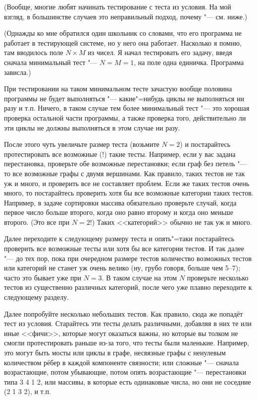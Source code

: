 (Вообще, многие любят начинать тестирование с теста из условия. На мой взгляд, в большинстве случаев это неправильный подход, почему "--- см. ниже.)

(Однажды ко мне обратился один школьник со словами, что его программа не работает в тестирующей системе, но у него она работает.
Насколько я помню, там вводилось поле $N\times M$ из чисел. 
Я начал тестировать его задачу, введя сначала минимальный тест "--- $N=M=1$, на поле одна единичка. 
Программа зависла.)

При тестировании на таком минимальном тесте зачастую вообще половина программы не будет выполняться "--- какие"=нибудь циклы не выполняться ни разу и т.п.
Ничего, в таком случае тем более минимальный тест "--- это хорошая проверка остальной части программы,
а также проверка того, действительно ли эти циклы не должны выполняться в этом случае ни разу.

После этого чуть увеличьте размер теста (возьмите $N=2$) и постарайтесь протестировать все возможные (!) такие тесты. 
Например, если у вас задана перестановка, проверьте обе возможные перестановки; если граф без петель "--- то все возможные графы с двумя вершинами. 
Как правило, таких тестов не так уж и много, и проверить все не составляет проблем. 
Если же таких тестов очень много, то постарайтесь проверить хотя бы все возможные категории таких тестов. 
Например, в задаче сортировки массива обязательно проверьте случай, когда первое число больше второго, когда оно равно второму и когда оно меньше второго. 
(Это все при $N=2$!) Таких <<категорий>> обычно не так уж и много.

Далее переходите к следующему размеру теста и опять"=таки постарайтесь проверить все возможные тесты или хотя бы все категории тестов. И так далее "--- до тех пор, пока при очередном размере тестов количество возможных тестов или категорий не станет уж очень велико (ну, грубо говоря, больше чем 5--7); часто это бывает уже при $N=3$. В таком случае на этом $N$ проверьте несколько тестов из существенно различных категорий, после чего уже плавно переходите к следующему разделу.

Далее попробуйте несколько небольших тестов. Как правило, сюда же попадёт тест из условия. 
Старайтесь эти тесты делать различными, добавляя в них те или иные <<фичи>>, которые могут оказаться важны, 
но которые вы толком не смогли протестировать раньше из-за того, что тесты были маленькие. 
Например, это могут быть мосты или циклы в графе, несвязные графы с ненулевым количеством рёбер в каждой компоненте связности; 
или сложные "--- сначала возрастающие, потом убывающие, потом опять возрастающие "--- перестановки типа 3 4 1 2, или массивы, в которые есть одинаковые числа, 
но они не соседние (2 1 3 2), и т.п.

